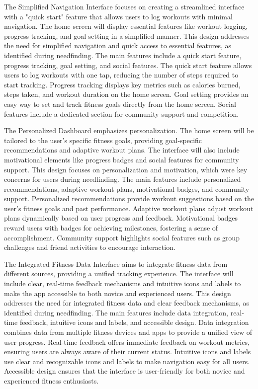 \documentclass[
	letterpaper, %
]{jdf}
\begin{document}
The Simplified Navigation Interface focuses on creating a streamlined interface with a "quick start" feature that allows users to log workouts with minimal navigation. The home screen will display essential features like workout logging, progress tracking, and goal setting in a simplified manner. This design addresses the need for simplified navigation and quick access to essential features, as identified during needfinding. The main features include a quick start feature, progress tracking, goal setting, and social features. The quick start feature allows users to log workouts with one tap, reducing the number of steps required to start tracking. Progress tracking displays key metrics such as calories burned, steps taken, and workout duration on the home screen. Goal setting provides an easy way to set and track fitness goals directly from the home screen. Social features include a dedicated section for community support and competition.

The Personalized Dashboard emphasizes personalization. The home screen will be tailored to the user's specific fitness goals, providing goal-specific recommendations and adaptive workout plans. The interface will also include motivational elements like progress badges and social features for community support. This design focuses on personalization and motivation, which were key concerns for users during needfinding. The main features include personalized recommendations, adaptive workout plans, motivational badges, and community support. Personalized recommendations provide workout suggestions based on the user's fitness goals and past performance. Adaptive workout plans adjust workout plans dynamically based on user progress and feedback. Motivational badges reward users with badges for achieving milestones, fostering a sense of accomplishment. Community support highlights social features such as group challenges and friend activities to encourage interaction.

The Integrated Fitness Data Interface aims to integrate fitness data from different sources, providing a unified tracking experience. The interface will include clear, real-time feedback mechanisms and intuitive icons and labels to make the app accessible to both novice and experienced users. This design addresses the need for integrated fitness data and clear feedback mechanisms, as identified during needfinding. The main features include data integration, real-time feedback, intuitive icons and labels, and accessible design. Data integration combines data from multiple fitness devices and apps to provide a unified view of user progress. Real-time feedback offers immediate feedback on workout metrics, ensuring users are always aware of their current status. Intuitive icons and labels use clear and recognizable icons and labels to make navigation easy for all users. Accessible design ensures that the interface is user-friendly for both novice and experienced fitness enthusiasts.
\end{document}
